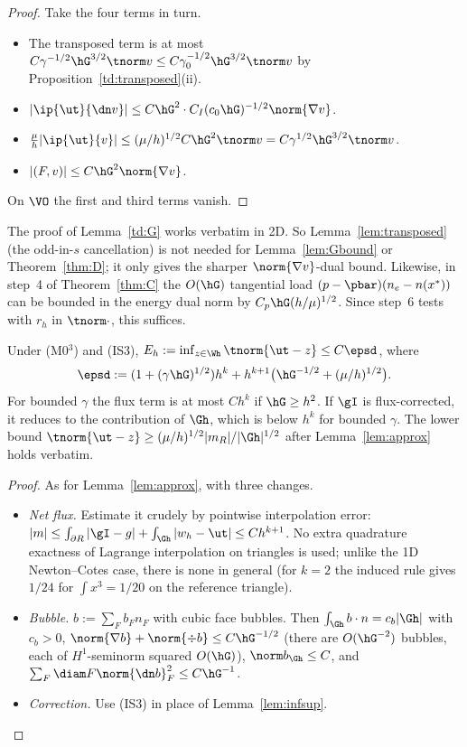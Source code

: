 \begin{proof}
Take the four terms in turn.
\begin{itemize}
\item The transposed term is at most $C\gamma^{-1/2}\hG^{3/2}\tnorm v\le C\gamma_0^{-1/2}\hG^{3/2}\tnorm v$ by Proposition~\ref{td:transposed}(ii).
\item $|\ip{\ut}{\dn v}|\le C\hG^2\cdot C_I(c_0\hG)^{-1/2}\norm{\nabla v}$.
\item $\frac\mu h|\ip{\ut}{v}|\le(\mu/h)^{1/2}C\hG^2\tnorm v=C\gamma^{1/2}\hG^{3/2}\tnorm v$.
\item $|(F,v)|\le C\hG^2\norm{\nabla v}$.
\end{itemize}
On $\VO$ the first and third terms vanish.
\end{proof}

\begin{remark}\label{td:nocancel2d}
The proof of Lemma~\ref{td:G} works verbatim in 2D. So Lemma~\ref{lem:transposed} (the odd-in-$s$ cancellation) is not needed for Lemma~\ref{lem:Gbound} or Theorem~\ref{thm:D}; it only gives the sharper $\norm{\nabla v}$-dual bound. Likewise, in step~4 of Theorem~\ref{thm:C} the $O(\hG)$ tangential load $(p-\pbar)(n_e-n(x^\ast))$ can be bounded in the energy dual norm by $C_p\hG(h/\mu)^{1/2}$. Since step~6 tests with $r_h$ in $\tnorm\cdot$, this suffices.
\end{remark}

\begin{lemma}[Approximation in $\Wh$]\label{td:approx}
Under (M0$^3$) and (IS3), $E_h:=\inf_{z\in\Wh}\tnorm{\ut-z}\le C\epsd$, where
\[
\epsd:=(1+(\gamma\hG)^{1/2})h^k+h^{k+1}\bigl(\hG^{-1/2}+(\mu/h)^{1/2}\bigr).
\]
For bounded $\gamma$ the flux term is at most $Ch^k$ if $\hG\ge h^2$. If $\gI$ is flux-corrected, it reduces to the contribution of $\Gh$, which is below $h^k$ for bounded $\gamma$. The lower bound $\tnorm{\ut-z}\ge(\mu/h)^{1/2}|m_R|/|\Gh|^{1/2}$ after Lemma~\ref{lem:approx} holds verbatim.
\end{lemma}

\begin{proof}
As for Lemma~\ref{lem:approx}, with three changes.
\begin{itemize}
\item \emph{Net flux.} Estimate it crudely by pointwise interpolation error: $|m|\le\int_{\partial R}|\gI-g|+\int_{\Gh}|w_h-\ut|\le Ch^{k+1}$. No extra quadrature exactness of Lagrange interpolation on triangles is used; unlike the 1D Newton--Cotes case, there is none in general (for $k=2$ the induced rule gives $1/24$ for $\int x^3=1/20$ on the reference triangle).
\item \emph{Bubble.} $b:=\sum_Fb_Fn_F$ with cubic face bubbles. Then $\int_{\Gh}b\cdot n=c_b|\Gh|$ with $c_b>0$, $\norm{\nabla b}+\norm{\div b}\le C\hG^{-1/2}$ (there are $O(\hG^{-2})$ bubbles, each of $H^1$-seminorm squared $O(\hG)$), $\norm b_{\Gh}\le C$, and $\sum_F\diam F\norm{\dn b}^2_F\le C\hG^{-1}$.
\item \emph{Correction.} Use (IS3) in place of Lemma~\ref{lem:infsup}.\qedhere
\end{itemize}
\end{proof}

